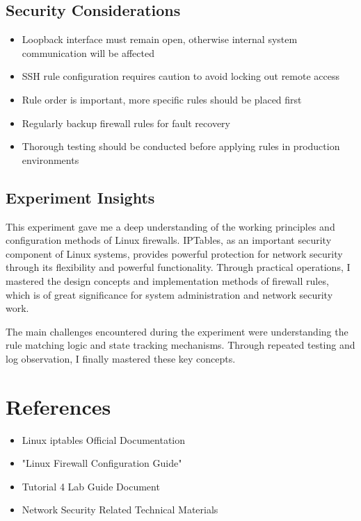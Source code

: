 \documentclass[12pt,a4paper]{article}
\begin{document}
\subsection{Security Considerations}
\begin{itemize}
    \item Loopback interface must remain open, otherwise internal system communication will be affected
    \item SSH rule configuration requires caution to avoid locking out remote access
    \item Rule order is important, more specific rules should be placed first
    \item Regularly backup firewall rules for fault recovery
    \item Thorough testing should be conducted before applying rules in production environments
\end{itemize}

\subsection{Experiment Insights}
This experiment gave me a deep understanding of the working principles and configuration methods of Linux firewalls. IPTables, as an important security component of Linux systems, provides powerful protection for network security through its flexibility and powerful functionality. Through practical operations, I mastered the design concepts and implementation methods of firewall rules, which is of great significance for system administration and network security work.

The main challenges encountered during the experiment were understanding the rule matching logic and state tracking mechanisms. Through repeated testing and log observation, I finally mastered these key concepts.

\section{References}
\begin{itemize}
    \item Linux iptables Official Documentation
    \item "Linux Firewall Configuration Guide"
    \item Tutorial 4 Lab Guide Document
    \item Network Security Related Technical Materials
\end{itemize}
\end{document}
